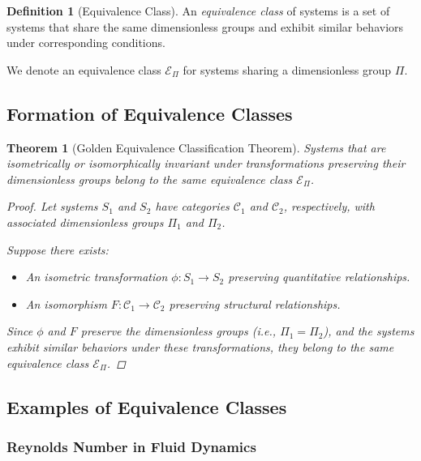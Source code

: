 \documentclass{article}
\newtheorem{theorem}{Theorem}[section]
\theoremstyle{definition}
\newtheorem{definition}{Definition}[section]
\theoremstyle{remark}
\begin{document}
	\begin{definition}[Equivalence Class]
		An \emph{equivalence class} of systems is a set of systems that share the same dimensionless groups and exhibit similar behaviors under corresponding conditions.
		
		We denote an equivalence class $\mathcal{E}_\Pi$ for systems sharing a dimensionless group $\Pi$.
	\end{definition}
	
	\subsection{Formation of Equivalence Classes}
	
	\begin{theorem}[Golden Equivalence Classification Theorem]
		Systems that are isometrically or isomorphically invariant under transformations preserving their dimensionless groups belong to the same equivalence class $\mathcal{E}_\Pi$.
		
		\begin{proof}
			Let systems $S_1$ and $S_2$ have categories $\mathcal{C}_1$ and $\mathcal{C}_2$, respectively, with associated dimensionless groups $\Pi_1$ and $\Pi_2$.
			
			Suppose there exists:
			\begin{itemize}
				\item An isometric transformation $\phi: S_1 \rightarrow S_2$ preserving quantitative relationships.
				\item An isomorphism $F: \mathcal{C}_1 \rightarrow \mathcal{C}_2$ preserving structural relationships.
			\end{itemize}
			
			Since $\phi$ and $F$ preserve the dimensionless groups (i.e., $\Pi_1 = \Pi_2$), and the systems exhibit similar behaviors under these transformations, they belong to the same equivalence class $\mathcal{E}_\Pi$.
		\end{proof}
	\end{theorem}
	
	\subsection{Examples of Equivalence Classes}
	
	\subsubsection{Reynolds Number in Fluid Dynamics}
	
\end{document}
